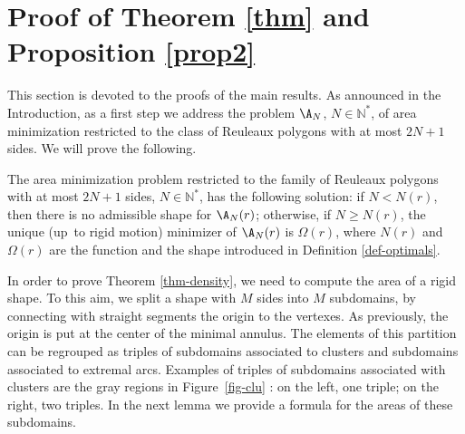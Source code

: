 \section{Proof of Theorem \ref{thm} and Proposition \ref{prop2}}\label{sec-proof}

This section is devoted to the proofs of the main results. As announced in the Introduction, as a first step we address the problem $\A_N$, $N\in \mathbb N^*$, of area minimization restricted to the class of Reuleaux polygons with at most $2N+1$ sides. We will prove the following.

\begin{theorem}\label{thm-density}
The area minimization problem restricted to the family of Reuleaux polygons with at most $2N+1$ sides, $N\in \mathbb N^*$, has the following solution: {if $N<N(r)$, then there is no admissible shape for $\A_N(r)$; otherwise, if $N\geq N(r)$, the unique (up~to rigid motion) minimizer of $\A_N(r)$ is $\Omega(r)$,}
where $N(r)$ and $\Omega(r)$ are the function and the shape introduced in Definition \ref{def-optimals}.
\end{theorem}
In order to prove Theorem \ref{thm-density}, we need to compute the area of a rigid shape. To this aim, we split a shape with $M$ sides into $M$ subdomains, by connecting with straight segments the origin to the vertexes. As previously, the origin is put at the center
of the minimal annulus. The elements of this partition can be regrouped as triples of subdomains associated to clusters and subdomains associated to extremal arcs. {Examples of triples of subdomains associated with clusters are the gray regions in Figure~\ref{fig-clu} : on the left, one triple; on the right, two triples.} In the next lemma we provide a formula for the areas of these subdomains.


